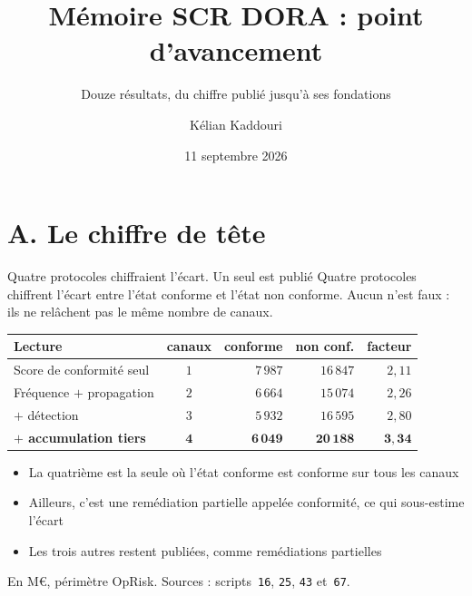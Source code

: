 \documentclass[11pt]{beamer}
\title[Point d'avancement]{Mémoire SCR DORA : point d'avancement}
\subtitle{Douze résultats, du chiffre publié jusqu'à ses fondations}
\author[K. Kaddouri]{Kélian Kaddouri}
\institute[ENSAE / Nexialog]{ENSAE / Nexialog Consulting}
\date[11/09/2026]{11 septembre 2026}
\begin{document}
\begin{frame}
\titlepage
\end{frame}

\section*{A. Le chiffre de tête}

\begin{frame}{Quatre protocoles chiffraient l'écart. Un seul est publié}
\small
Quatre protocoles chiffrent \og{}l'écart entre l'état conforme et l'état non conforme\fg{}.
Aucun n'est faux : ils ne relâchent pas le même nombre de canaux.
\vspace{1mm}

\begin{center}\small
\begin{tabular}{@{}l c r r r@{}}
\toprule
\textbf{Lecture} & \textbf{canaux} & \textbf{conforme} & \textbf{non conf.} & \textbf{facteur} \\
\midrule
Score de conformité seul & $1$ & $7\,987$ & $16\,847$ & $2{,}11$ \\
Fréquence $+$ propagation & $2$ & $6\,664$ & $15\,074$ & $2{,}26$ \\
$+$ détection & $3$ & $5\,932$ & $16\,595$ & $2{,}80$ \\
\textbf{$+$ accumulation tiers} & $\mathbf{4}$ & $\mathbf{6\,049}$ & $\mathbf{20\,188}$ &
$\mathbf{3{,}34}$ \\
\bottomrule
\end{tabular}
\end{center}
\vspace{2mm}

\begin{itemize}\itemsep4pt
  \item \alert{La quatrième est la seule où l'état conforme est conforme sur tous les canaux}
  \item Ailleurs, c'est une remédiation partielle appelée conformité, ce qui sous-estime l'écart
  \item Les trois autres restent publiées, comme remédiations partielles
\end{itemize}
\vspace{1mm}
{\scriptsize En M\euro, périmètre OpRisk. Sources : scripts~\texttt{16}, \texttt{25},
\texttt{43} et~\texttt{67}.}
\end{frame}
\end{document}
